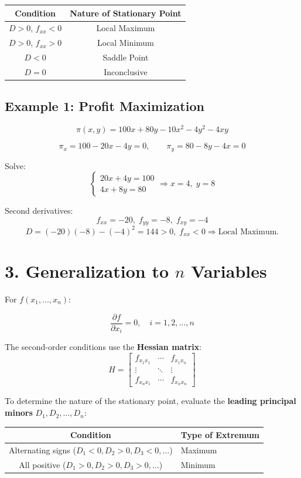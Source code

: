 \documentclass[12pt]{article}
\begin{document}
\begin{center}
\begin{tabular}{c|c}
\textbf{Condition} & \textbf{Nature of Stationary Point} \\ \hline
$D>0$, $f_{xx}<0$ & Local Maximum \\
$D>0$, $f_{xx}>0$ & Local Minimum \\
$D<0$ & Saddle Point \\
$D=0$ & Inconclusive
\end{tabular}
\end{center}



\subsection*{Example 1: Profit Maximization}

\[
\pi(x,y) = 100x + 80y - 10x^2 - 4y^2 - 4xy
\]

\[
\pi_x = 100 - 20x - 4y = 0, \qquad \pi_y = 80 - 8y - 4x = 0
\]

Solve:
\[
\begin{cases}
20x + 4y = 100 \\
4x + 8y = 80
\end{cases}
\Rightarrow x=4, \; y=8
\]

Second derivatives:
\[
f_{xx}=-20, \; f_{yy}=-8, \; f_{xy}=-4
\]
\[
D = (-20)(-8) - (-4)^2 = 144 > 0, \; f_{xx}<0
\Rightarrow \text{Local Maximum.}
\]



\section*{3. Generalization to \(n\) Variables}

For \(f(x_1, \ldots, x_n)\):

\[
\frac{\partial f}{\partial x_i} = 0, \quad i = 1,2,\ldots,n
\]

The second-order conditions use the \textbf{Hessian matrix}:
\[
H =
\begin{bmatrix}
f_{x_1x_1} & \cdots & f_{x_1x_n} \\
\vdots & \ddots & \vdots \\
f_{x_nx_1} & \cdots & f_{x_nx_n}
\end{bmatrix}
\]

To determine the nature of the stationary point, evaluate the \textbf{leading principal minors} \(D_1, D_2, \ldots, D_n\):

\begin{center}
\begin{tabular}{c|l}
\textbf{Condition} & \textbf{Type of Extremum} \\ \hline
Alternating signs ($D_1<0, D_2>0, D_3<0,\ldots$) & Maximum \\
All positive ($D_1>0, D_2>0, D_3>0,\ldots$) & Minimum
\end{tabular}
\end{center}
\end{document}
